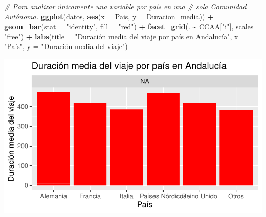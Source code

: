 \documentclass[data,article,submit,moreauthors,pdftex]{Definitions/mdpi}
\newenvironment{Shaded}{\begin{snugshade}}{\end{snugshade}}
\newcommand{\AttributeTok}[1]{\textcolor[rgb]{0.13,0.29,0.53}{#1}}
\newcommand{\CommentTok}[1]{\textcolor[rgb]{0.56,0.35,0.01}{\textit{#1}}}
\newcommand{\FunctionTok}[1]{\textcolor[rgb]{0.13,0.29,0.53}{\textbf{#1}}}
\newcommand{\NormalTok}[1]{#1}
\newcommand{\SpecialCharTok}[1]{\textcolor[rgb]{0.81,0.36,0.00}{\textbf{#1}}}
\newcommand{\StringTok}[1]{\textcolor[rgb]{0.31,0.60,0.02}{#1}}
\begin{document}
\begin{Shaded}
\begin{Highlighting}[]
\CommentTok{\# Para analizar únicamente una variable por país en una}
\CommentTok{\# sola Comunidad Autónoma.}
\FunctionTok{ggplot}\NormalTok{(datos, }\FunctionTok{aes}\NormalTok{(}\AttributeTok{x =}\NormalTok{ Pais, }\AttributeTok{y =}\NormalTok{ Duracion\_media)) }\SpecialCharTok{+} \FunctionTok{geom\_bar}\NormalTok{(}\AttributeTok{stat =} \StringTok{"identity"}\NormalTok{,}
    \AttributeTok{fill =} \StringTok{"red"}\NormalTok{) }\SpecialCharTok{+} \FunctionTok{facet\_grid}\NormalTok{(. }\SpecialCharTok{\textasciitilde{}}\NormalTok{ CCAA[}\StringTok{"i"}\NormalTok{], }\AttributeTok{scales =} \StringTok{"free"}\NormalTok{) }\SpecialCharTok{+}
    \FunctionTok{labs}\NormalTok{(}\AttributeTok{title =} \StringTok{"Duración media del viaje por país en Andalucía"}\NormalTok{,}
        \AttributeTok{x =} \StringTok{"País"}\NormalTok{, }\AttributeTok{y =} \StringTok{"Duración media del viaje"}\NormalTok{)}
\end{Highlighting}
\end{Shaded}

\includegraphics{ProyectoAED2024_Rmd_files/figure-latex/unnamed-chunk-27-3.pdf}
\end{document}
